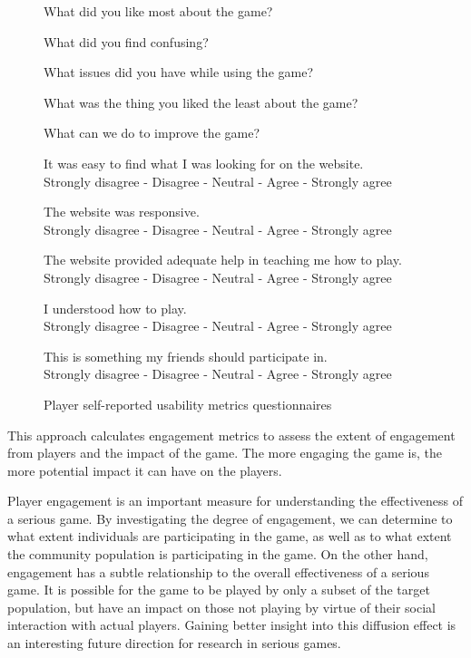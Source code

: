 \begin{figure}[ht!]
\begin{mybox}
\begin{compactenum}
\item What did you like most about the game?
\item What did you find confusing?
\item What issues did you have while using the game?
\item What was the thing you liked the least about the game?
\item What can we do to improve the game?
\item It was easy to find what I was looking for on the website.  \\
	Strongly disagree  -  Disagree  -  Neutral  -  Agree  -  Strongly agree
\item The website was responsive. \\
	Strongly disagree  -  Disagree  -  Neutral  -  Agree  -  Strongly agree
\item The website provided adequate help in teaching me how to play. \\
	Strongly disagree  -  Disagree  -  Neutral  -  Agree  -  Strongly agree
\item I understood how to play. \\
	Strongly disagree  -  Disagree  -  Neutral  -  Agree  -  Strongly agree
\item This is something my friends should participate in. \\
	Strongly disagree  -  Disagree  -  Neutral  -  Agree  -  Strongly agree
\end{compactenum}
\end{mybox}
\caption{Player self-reported usability metrics questionnaires}
\label{fig:usability-metrics}  
\end{figure}

\label{Engagement metrics}

This approach calculates engagement metrics to assess the extent of engagement from players and 
the impact of the game. The more engaging the game is, the more potential impact it can have on the players.

Player engagement is an important measure for understanding the effectiveness of a serious game.
By investigating the degree of engagement, we can determine to what extent individuals are
participating in the game, as well as to what extent the community population is participating in
the game. On the other hand, engagement has a subtle relationship to the overall effectiveness of a 
serious game. It is possible for the game to be played by only a subset of the target population, but
have an impact on those not playing by virtue of their social interaction with actual players. Gaining
better insight into this diffusion effect is an interesting future direction for research in serious games.

